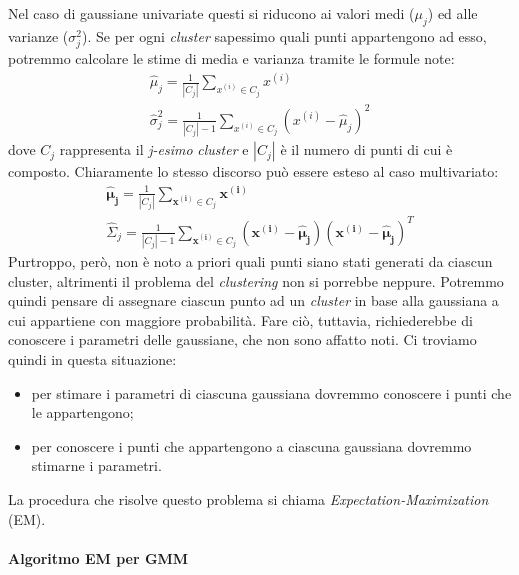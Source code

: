 Nel caso di gaussiane univariate questi si riducono ai valori medi ($\mu_j$) ed alle varianze ($\sigma^2_j$). Se per ogni \emph{cluster} sapessimo quali punti appartengono ad esso, potremmo calcolare le stime di media e varianza tramite le formule note:
\begin{gather*}
\hat\mu_j = \frac{1}{|C_j|} \sum_{ x^{(i)} \in C_j} x^{(i)} \\
\hat\sigma^2_j = \frac{1}{|C_j|-1} \sum_{x^{(i)} \in C_j}(x^{(i)}- \hat\mu_j)^2
\end{gather*}
dove ${C_j}$ rappresenta il \emph{j-esimo} \emph{cluster} e $|{C_j}|$ è il numero di punti di cui è composto. Chiaramente lo stesso discorso può essere esteso al caso multivariato:
\begin{gather*}
\boldsymbol{\hat\mu_j} = \frac{1}{|C_j|} \sum_{ \mathbf{x^{(i)}} \in C_j} \mathbf{x^{(i)}} \\
\hat\Sigma_j = \frac{1}{|C_j|-1} \sum_{\mathbf{x^{(i)}} \in C_j}(\mathbf{x^{(i)}}- \boldsymbol{\hat\mu_j})(\mathbf{x^{(i)}}- \boldsymbol{\hat\mu_j})^T
\end{gather*}
Purtroppo, però, non è noto a priori quali punti siano stati generati da ciascun cluster, altrimenti il problema del \emph{clustering} non si porrebbe neppure. Potremmo quindi pensare di assegnare ciascun punto ad un \emph{cluster} in base alla gaussiana a cui appartiene con maggiore probabilità. Fare ciò, tuttavia, richiederebbe di conoscere i parametri delle gaussiane, che non sono affatto noti. Ci troviamo quindi in questa situazione:
\begin{itemize}
\item per stimare i parametri di ciascuna gaussiana dovremmo conoscere i punti che le appartengono;
\item per conoscere i punti che appartengono a ciascuna gaussiana dovremmo stimarne i parametri.
\end{itemize}
La procedura che risolve questo problema si chiama \emph{Expectation-Maximization} (EM).

\paragraph{Algoritmo EM per GMM}

